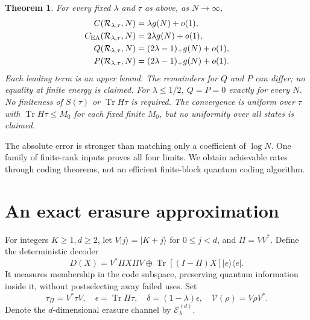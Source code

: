 \documentclass[11pt]{article}
\newtheorem{theorem}{Theorem}
\newcommand{\Tr}{\operatorname{Tr}}
\newcommand{\Rcal}{\mathcal R_{\lambda,\tau}}
\begin{document}
\begin{theorem}\label{thm:main}
For every fixed $\lambda$ and $\tau$ as above, as $N\to\infty$,
\begin{align}
 C(\Rcal,N)&=\lambda g(N)+o(1),\label{eq:c}\\
 C_{\rm EA}(\Rcal,N)&=2\lambda g(N)+o(1),\label{eq:ea}\\
 Q(\Rcal,N)&=(2\lambda-1)_+g(N)+o(1),\label{eq:q}\\
 P(\Rcal,N)&=(2\lambda-1)_+g(N)+o(1).\label{eq:p}
\end{align}
Each leading term is an upper bound. The remainders for $Q$ and $P$
can differ; no equality at finite energy is claimed.
For $\lambda\le1/2$, $Q=P=0$ exactly for every $N$.
No finiteness of $S(\tau)$ or $\Tr H\tau$ is required.
The convergence is uniform over $\tau$ with $\Tr H\tau\le M_0$
for each fixed finite $M_0$, but no uniformity over all states is claimed.
\end{theorem}
The absolute error is stronger than matching only a coefficient of
$\log N$. One family of finite-rank inputs proves all four limits.
We obtain achievable rates through coding theorems, not an efficient
finite-block quantum coding algorithm.

\section{An exact erasure approximation}
For integers $K\ge1,d\ge2$, let $V|j\rangle=|K+j\rangle$
for $0\le j<d$, and $\Pi=VV^*$. Define the deterministic decoder
\begin{equation}\label{eq:decoder}
 D(X)=V^*\Pi X\Pi V\oplus\Tr[(I-\Pi)X]|e\rangle\langle e|.
\end{equation}
It measures membership in the code subspace, preserving quantum information
inside it, without postselecting away failed uses. Set
\begin{equation}\label{eq:delta}
 \tau_\Pi=V^*\tau V,\quad \epsilon=\Tr\Pi\tau,\quad
 \delta=(1-\lambda)\epsilon,\quad \mathcal V(\rho)=V\rho V^*.
\end{equation}
Denote the $d$-dimensional erasure channel by $\mathcal E_\lambda^{(d)}$.
\end{document}
